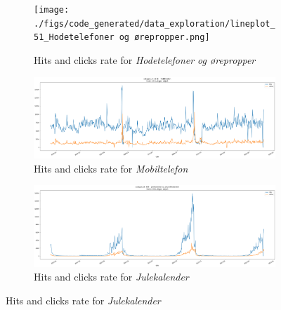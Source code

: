 \begin{figure}[h!]
  \centering
  \caption{Category plots of hits and click rate from 2019-2021}
  \label{fig:lineplot1}
  \begin{subfigure}[b]{\textwidth}
      \texttt{[image: ./figs/code\_generated/data\_exploration/lineplot\_51\_Hodetelefoner og ørepropper.png]}
      \hfill
      \caption{Hits and clicks rate for \textit{Hodetelefoner og ørepropper}}
      \label{fig:lineplot-Hodetelefoner}
  \end{subfigure}

  \begin{subfigure}[b]{\textwidth}
      \includegraphics[width=\textwidth]{./figs/code_generated/data_exploration/lineplot_19_Mobiltelefon.png}
      \hfill
      \caption{Hits and clicks rate for \textit{Mobiltelefon}}
      \label{fig:lineplot-Mobiltelefon}
  \end{subfigure}

  \begin{subfigure}[b]{\textwidth}
      \includegraphics[width=\textwidth]{./figs/code_generated/data_exploration/lineplot_11781_Julekalender og adventskalender.png}
      \hfill
      \caption{Hits and clicks rate for \textit{Julekalender}}
      \label{fig:lineplot-Julekalender}
  \end{subfigure}
\end{figure}


